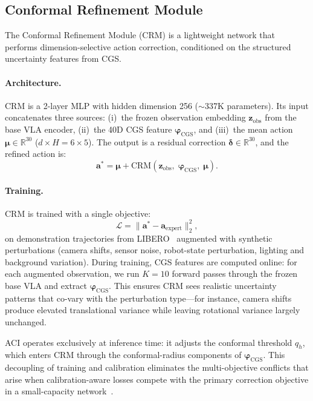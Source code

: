 \subsection{Conformal Refinement Module}
\label{sec:crm}

The Conformal Refinement Module (CRM) is a lightweight network that performs dimension-selective action correction, conditioned on the structured uncertainty features from CGS.

\paragraph{Architecture.}
CRM is a 2-layer MLP with hidden dimension 256 (${\sim}$337K parameters).  Its input concatenates three sources:
(i)~the frozen observation embedding $\mathbf{z}_{\mathrm{obs}}$ from the base VLA encoder,
(ii)~the 40D CGS feature $\boldsymbol{\varphi}_{\mathrm{CGS}}$, and
(iii)~the mean action $\boldsymbol{\mu} \in \mathbb{R}^{30}$ ($d{\times}H = 6{\times}5$).
The output is a residual correction $\boldsymbol{\delta} \in \mathbb{R}^{30}$, and the refined action is:
\begin{equation}
  \mathbf{a}^* = \boldsymbol{\mu} + \mathrm{CRM}(\mathbf{z}_{\mathrm{obs}},\;\boldsymbol{\varphi}_{\mathrm{CGS}},\;\boldsymbol{\mu}).
  \label{eq:crm}
\end{equation}

\paragraph{Training.}
CRM is trained with a single objective:
\begin{equation}
  \mathcal{L} = \bigl\|\mathbf{a}^* - \mathbf{a}_{\mathrm{expert}}\bigr\|_2^2,
  \label{eq:crm_loss}
\end{equation}
on demonstration trajectories from LIBERO~\cite{liu2023libero} augmented with synthetic perturbations (camera shifts, sensor noise, robot-state perturbation, lighting and background variation).  During training, CGS features are computed online: for each augmented observation, we run $K{=}10$ forward passes through the frozen base VLA and extract $\boldsymbol{\varphi}_{\mathrm{CGS}}$.  This ensures CRM sees realistic uncertainty patterns that co-vary with the perturbation type---for instance, camera shifts produce elevated translational variance while leaving rotational variance largely unchanged.

ACI operates exclusively at inference time: it adjusts the conformal threshold $q_h$, which enters CRM through the conformal-radius components of $\boldsymbol{\varphi}_{\mathrm{CGS}}$.  This decoupling of training and calibration eliminates the multi-objective conflicts that arise when calibration-aware losses compete with the primary correction objective in a small-capacity network~\cite{wang2025cploop}.

